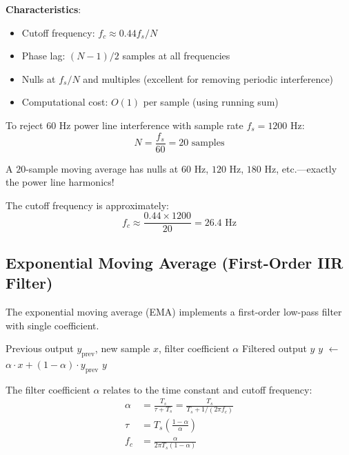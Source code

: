\textbf{Characteristics}:
\begin{itemize}
    \item Cutoff frequency: $f_c \approx 0.44 f_s / N$
    \item Phase lag: $(N-1)/2$ samples at all frequencies
    \item Nulls at $f_s/N$ and multiples (excellent for removing periodic interference)
    \item Computational cost: $O(1)$ per sample (using running sum)
\end{itemize}

\begin{example}
\label{ex:ma_60hz}

To reject $60\text{ Hz}$ power line interference with sample rate $f_s = 1200\text{ Hz}$:
\begin{equation}
N = \frac{f_s}{60} = 20\text{ samples}
\end{equation}

A $20$-sample moving average has nulls at $60\text{ Hz}$, $120\text{ Hz}$, $180\text{ Hz}$, etc.---exactly the power line harmonics!

The cutoff frequency is approximately:
\begin{equation}
f_c \approx \frac{0.44 \times 1200}{20} = 26.4\text{ Hz}
\end{equation}
\end{example}

\subsection{Exponential Moving Average (First-Order IIR Filter)}

The exponential moving average (EMA) implements a first-order low-pass filter with single coefficient.

\begin{algorithm}[htbp]
\caption{Exponential Moving Average Filter}
\label{alg:ema}
\begin{algorithmic}
\REQUIRE Previous output $y_{\text{prev}}$, new sample $x$, filter coefficient $\alpha$
\ENSURE Filtered output $y$
\STATE $y$ $\leftarrow$ $\alpha \cdot x + (1 - \alpha) \cdot y_{\text{prev}}$
\RETURN $y$
\end{algorithmic}
\end{algorithm}

The filter coefficient $\alpha$ relates to the time constant and cutoff frequency:
\begin{align}
\alpha &= \frac{T_s}{\tau + T_s} = \frac{T_s}{T_s + 1/(2\pi f_c)} \label{eq:ema_alpha}\\
\tau &= T_s \left(\frac{1-\alpha}{\alpha}\right) \label{eq:ema_tau}\\
f_c &= \frac{\alpha}{2\pi T_s (1-\alpha)} \label{eq:ema_fc}
\end{align}


